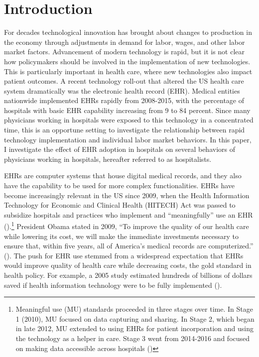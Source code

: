 \documentclass[12pt]{article}
\begin{document}
	\onehalfspacing
	
	\newpage

\section{Introduction}

For decades technological innovation has brought about changes to production in the economy through adjustments in demand for labor, wages, and other labor market factors. Advancement of modern technology is rapid, but it is not clear how policymakers should be involved in the implementation of new technologies. This is particularly important in health care, where new technologies also impact patient outcomes. A recent technology roll-out that altered the US health care system dramatically was the electronic health record (EHR). Medical entities nationwide implemented EHRs rapidly from 2008-2015, with the percentage of hospitals with basic EHR capability increasing from 9 to 84 percent. Since many physicians working in hospitals were exposed to this technology in a concentrated time, this is an opportune setting to investigate the relationship between rapid technology implementation and individual labor market behaviors. In this paper, I investigate the effect of EHR adoption in hospitals on several behaviors of physicians working in hospitals, hereafter referred to as hospitalists. 

EHRs are computer systems that house digital medical records, and they also have the capability to be used for more complex functionalities. EHRs have become increasingly relevant in the US since 2009, when the Health Information Technology for Economic and Clinical Health (HITECH) Act was passed to subsidize hospitals and practices who implement and ``meaningfully'' use an EHR (\cite{hitech}).\footnote{Meaningful use (MU) standards proceeded in three stages over time. In Stage 1 (2010), MU focused on data capturing and sharing. In Stage 2, which began in late 2012, MU extended to using EHRs for patient incorporation and using the technology as a helper in care. Stage 3 went from 2014-2016 and focused on making data accessible across hospitals (\cite{meanuse})} President Obama stated in 2009, “To improve the quality of our health care while lowering its cost, we will make the immediate investments necessary to ensure that, within five years, all of America’s medical records are computerized.” (\cite{presquote}). The push for EHR use stemmed from a widespread expectation that EHRs would improve quality of health care while decreasing costs, the gold standard in health policy. For example, a 2005 study estimated hundreds of billions of dollars saved if health information technology were to be fully implemented (\cite{hillestad2005}).
\end{document}
